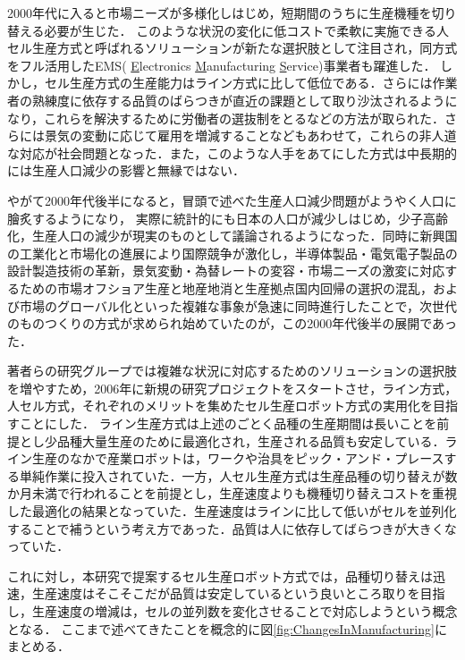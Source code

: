 2000年代に入ると市場ニーズが多様化しはじめ，短期間のうちに生産機種を切り替える必要が生じた．
このような状況の変化に低コストで柔軟に実施できる人セル生産方式と呼ばれるソリューションが新たな選択肢として注目され，同方式をフル活用したEMS(
\underline{E}lectronics
\underline{M}anufacturing
\underline{S}ervice)事業者も躍進した．
しかし，セル生産方式の生産能力はライン方式に比して低位である．さらには作業者の熟練度に依存する品質のばらつきが直近の課題として取り沙汰されるようになり，これらを解決するために労働者の選抜制をとるなどの方法が取られた．さらには景気の変動に応じて雇用を増減することなどもあわせて，これらの非人道な対応が社会問題となった．また，このような人手をあてにした方式は中長期的には生産人口減少の影響と無縁ではない．

やがて2000年代後半になると，冒頭で述べた生産人口減少問題がようやく人口に膾炙するようになり，
実際に統計的にも日本の人口が減少しはじめ，少子高齢化，生産人口の減少が現実のものとして議論されるようになった．同時に新興国の工業化と市場化の進展により国際競争が激化し，半導体製品・電気電子製品の設計製造技術の革新，景気変動・為替レートの変容・市場ニーズの激変に対応するための市場オフショア生産と地産地消と生産拠点国内回帰の選択の混乱，および市場のグローバル化といった複雑な事象が急速に同時進行したことで，次世代のものつくりの方式が求められ始めていたのが，この2000年代後半の展開であった．

著者らの研究グループでは複雑な状況に対応するためのソリューションの選択肢を増やすため，2006年に新規の研究プロジェクトをスタートさせ，ライン方式，人セル方式，それぞれのメリットを集めたセル生産ロボット方式の実用化を目指すことにした．
ライン生産方式は上述のごとく品種の生産期間は長いことを前提とし少品種大量生産のために最適化され，生産される品質も安定している．ライン生産のなかで産業ロボットは，ワークや治具をピック・アンド・プレースする単純作業に投入されていた．一方，人セル生産方式は生産品種の切り替えが数か月未満で行われることを前提とし，生産速度よりも機種切り替えコストを重視した最適化の結果となっていた．生産速度はラインに比して低いがセルを並列化することで補うという考え方であった．品質は人に依存してばらつきが大きくなっていた．

これに対し，本研究で提案するセル生産ロボット方式では，品種切り替えは迅速，生産速度はそこそこだが品質は安定しているという良いところ取りを目指し，生産速度の増減は，セルの並列数を変化させることで対応しようという概念となる．
ここまで述べてきたことを概念的に図\ref{fig:ChangesInManufacturing}にまとめる．

